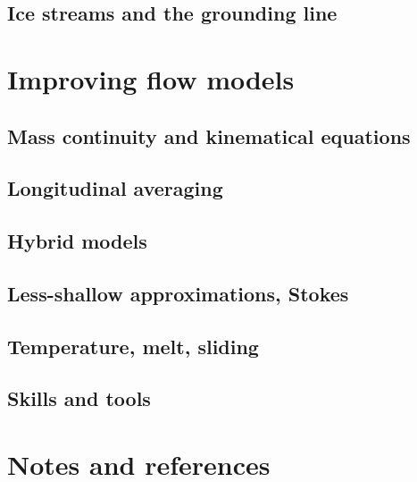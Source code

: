      \subsection{ Ice streams and the grounding line}

 \section{ Improving flow models}

     \subsection{ Mass continuity and kinematical equations}
     \subsection{ Longitudinal averaging}
     \subsection{ Hybrid models}
     \subsection{ Less-shallow approximations, Stokes}
     \subsection{ Temperature, melt, sliding}
     \subsection{ Skills and tools}
     
 \section{Notes and references}

  

\bex

\item {} 

\eex

